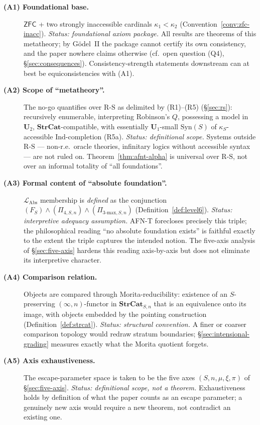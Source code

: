 \documentclass[11pt]{article}
\theoremstyle{plain}
\theoremstyle{definition}
\newcommand{\RS}{\mathrm{R\text{-}S}}
\newcommand{\LAbs}{\mathcal{L}_{\mathrm{Abs}}}
\newcommand{\Syn}{\mathrm{Syn}}
\newcommand{\ZFC}{\mathsf{ZFC}}
\begin{document}
\begin{description}
\item[\textbf{(A1) Foundational base.}] $\ZFC$ + two strongly inaccessible cardinals $\kappa_1 < \kappa_2$ (Convention~\ref{conv:zfc-inacc}). \emph{Status: foundational axiom package.} All results are theorems of this metatheory; by G\"odel~II the package cannot certify its own consistency, and the paper nowhere claims otherwise (cf.\ open question (Q4), \S\ref{sec:consequences}). Consistency-strength statements downstream can at best be equiconsistencies with (A1).
\item[\textbf{(A2) Scope of ``metatheory''.}] The no-go quantifies over $\RS$ as delimited by (R1)--(R5) (\S\ref{sec:rs}): recursively enumerable, interpreting Robinson's $Q$, possessing a model in $\mathbf{U}_2$, $\mathbf{StrCat}$-compatible, with essentially $\mathbf{U}_1$-small $\Syn(S)$ of $\kappa_S$-accessible $\mathrm{Ind}$-completion (R5a). \emph{Status: definitional scope.} Systems outside $\RS$ --- non-r.e.\ oracle theories, infinitary logics without accessible syntax --- are not ruled on. Theorem~\ref{thm:afnt-alpha} is universal over $\RS$, not over an informal totality of ``all foundations''.
\item[\textbf{(A3) Formal content of ``absolute foundation''.}] $\LAbs$ membership is \emph{defined} as the conjunction $(F_S) \wedge (\Pi_{4, S, n}) \wedge (\Pi_{3\text{-max}, S, n})$ (Definition~\ref{def:level6}). \emph{Status: interpretive adequacy assumption.} AFN-T forecloses precisely this triple; the philosophical reading ``no absolute foundation exists'' is faithful exactly to the extent the triple captures the intended notion. The five-axis analysis of \S\ref{sec:five-axis} hardens this reading axis-by-axis but does not eliminate its interpretive character.
\item[\textbf{(A4) Comparison relation.}] Objects are compared through Morita-reducibility: existence of an $S$-preserving $(\infty, n)$-functor in $\mathbf{StrCat}_{S, n}$ that is an equivalence onto its image, with objects embedded by the pointing construction (Definition~\ref{def:strcat}). \emph{Status: structural convention.} A finer or coarser comparison topology would redraw stratum boundaries; \S\ref{sec:intensional-grading} measures exactly what the Morita quotient forgets.
\item[\textbf{(A5) Axis exhaustiveness.}] The escape-parameter space is taken to be the five axes $(S, n, \mu, \xi, \pi)$ of \S\ref{sec:five-axis}. \emph{Status: definitional scope, not a theorem.} Exhaustiveness holds by definition of what the paper counts as an escape parameter; a genuinely new axis would require a new theorem, not contradict an existing one.

\end{description}
\end{document}
